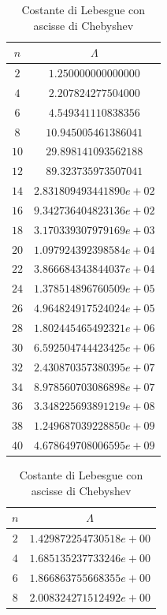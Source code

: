 \begin{table}[H]
	\begin{minipage}{0.5\textwidth}
		\centering
		\caption{Costante di Lebesgue con ascisse equispaziate}
		\begin{tabular}{|c|c|}
			\hline
			$n$ & $\Lambda$ \\
			\hline
			$2$  & $1.250000000000000$ \\
			$4$  & $2.207824277504000$ \\
			$6$  & $4.549341110838356$ \\
			$8$  & $10.945005461386041$ \\
			$10$ & $29.898141093562188$ \\
			$12$ & $89.323735973507041$ \\
			$14$ & $2.831809493441890e+02$ \\
			$16$ & $9.342736404823136e+02$ \\
			$18$ & $3.170339307979169e+03$ \\
			$20$ & $1.097924392398584e+04$ \\
			$22$ & $3.866684343844037e+04$ \\
			$24$ & $1.378514896760509e+05$ \\
			$26$ & $4.964824917524024e+05$ \\
			$28$ & $1.802445465492321e+06$ \\
			$30$ & $6.592504744423425e+06$ \\
			$32$ & $2.430870357380395e+07$ \\
			$34$ & $8.978560703086898e+07$ \\
			$36$ & $3.348225693891219e+08$ \\
			$38$ & $1.249687039228850e+09$ \\
			$40$ & $4.678649708006595e+09$ \\
			\hline
		\end{tabular}
	\end{minipage}
	\hspace*{\fill}
	\begin{minipage}{0.5\textwidth}
		\centering
		\caption{Costante di Lebesgue con ascisse di Chebyshev}
		\begin{tabular}{|c|c|}
			\hline
			$n$ & $\Lambda$ \\
			\hline
			$2$  & $1.429872254730518e+00$ \\
			$4$  & $1.685135237733246e+00$ \\
			$6$  & $1.866863755668355e+00$ \\
			$8$  & $2.008324271512492e+00$ \\

\end{tabular}
\end{minipage}
\end{table}
